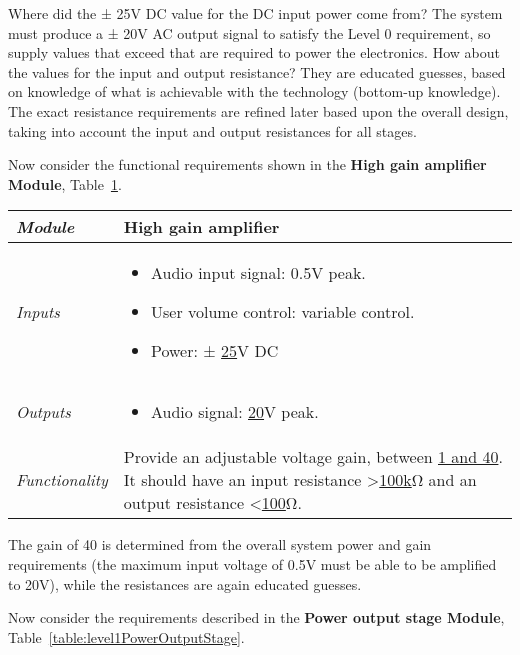 Where did the ± 25V DC value for the DC input power come from? The
system must produce a ± 20V AC output signal to satisfy the Level 0
requirement, so supply values that exceed that are required to power the
electronics. How about the values for the input and output resistance?
They are educated guesses, based on knowledge of what is achievable with
the technology (bottom-up knowledge). The exact resistance requirements
are refined later based upon the overall design, taking into account the
input and output resistances for all stages.

Now consider the functional requirements shown in the 
\textbf{High gain amplifier Module}, 
Table~\ref{table:level1HighGainAmp}.

\begin{table}[h]
\label{table:level1HighGainAmp}
\begin{tabular}{|l|m{10cm}|}
\hline
\emph{Module} &
High gain amplifier \\ \hline

\emph{Inputs} & 
\begin{itemize}
\item
  Audio input signal: 0.5V peak.
\item
  User volume control: variable control.
\item
  Power: ± \ul{25}V DC
\end{itemize}\\ \hline

\emph{Outputs} & 
\begin{itemize}
\item
  Audio signal: \ul{20}V peak.
\end{itemize} \\ \hline
\emph{Functionality} & Provide an adjustable voltage gain, between \ul{1
and 40}. It should have an input resistance \textgreater{}\ul{100k}Ω and
an output resistance \textless{}\ul{100}Ω. \\ \hline
\end{tabular}
\end{table}

The gain of 40 is determined from the overall system power and gain
requirements (the maximum input voltage of 0.5V must be able to be
amplified to 20V), while the resistances are again educated guesses.

Now consider the requirements described in the 
\textbf{Power output stage Module}, 
Table~\ref{table:level1PowerOutputStage}.


